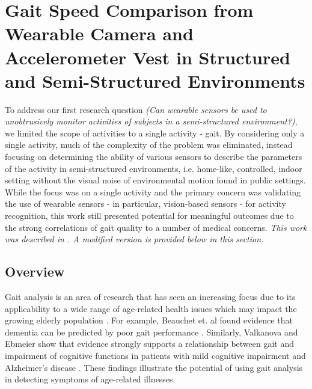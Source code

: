 \documentclass[12pt]{report}
\begin{document}
\section{Gait Speed Comparison from Wearable Camera and Accelerometer Vest in Structured and Semi-Structured Environments}
\label{validatingWearable}
To address our first research question \emph{(Can wearable sensors be used to unobtrusively monitor activities of subjects in a semi-structured environment?)}, we limited the scope of activities to a single activity - gait. By considering only a single activity, much of the complexity of the problem was eliminated, instead focusing on determining the ability of various sensors to describe the parameters of the activity in semi-structured environments, i.e. home-like, controlled, indoor setting without the visual noise of environmental motion found in public settings. While the focus was on a single activity and the primary concern was validating the use of wearable sensors - in particular, vision-based sensors - for activity recognition, this work still presented potential for meaningful outcomes due to the strong correlations of gait quality to a number of medical concerns. \emph{This work was described in \cite{Schneider2019ComparisonEnvironments}. A modified version is provided below in this section.}

\subsection{Overview}

Gait analysis is an area of research that has seen an increasing focus due to its applicability to a wide range of age-related health issues which may impact the growing elderly population \cite{Ortman2014AnStates}. For example, Beauchet et. al found evidence that dementia can be predicted by poor gait performance \cite{Beauchet2016PoorMeta-Analysis}. Similarly, Valkanova and Ebmeier show that evidence strongly supports a relationship between gait and impairment of cognitive functions in patients with mild cognitive impairment and Alzheimer's disease \cite{Valkanova2017WhatEvidence}. These findings illustrate the potential of using gait analysis in detecting symptoms of age-related illnesses.
\end{document}

